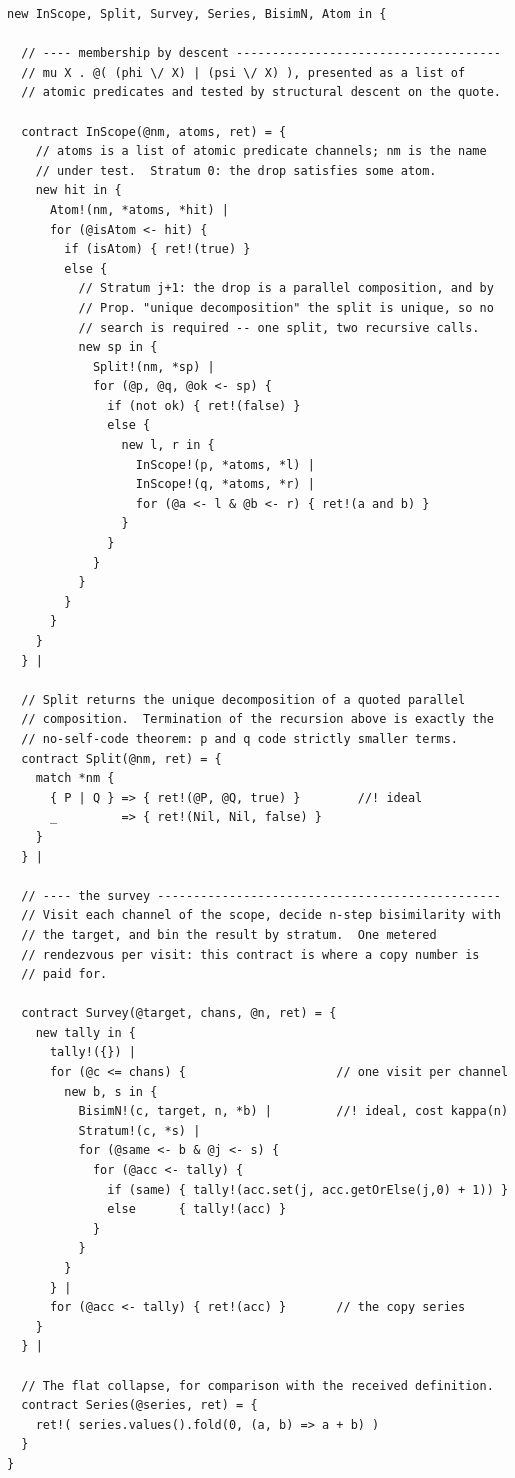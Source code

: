 \documentclass[11pt]{article}
\theoremstyle{plain}
\theoremstyle{definition}
\theoremstyle{remark}
\begin{document}
\begin{lstlisting}
new InScope, Split, Survey, Series, BisimN, Atom in {

  // ---- membership by descent -------------------------------------
  // mu X . @( (phi \/ X) | (psi \/ X) ), presented as a list of
  // atomic predicates and tested by structural descent on the quote.

  contract InScope(@nm, atoms, ret) = {
    // atoms is a list of atomic predicate channels; nm is the name
    // under test.  Stratum 0: the drop satisfies some atom.
    new hit in {
      Atom!(nm, *atoms, *hit) |
      for (@isAtom <- hit) {
        if (isAtom) { ret!(true) }
        else {
          // Stratum j+1: the drop is a parallel composition, and by
          // Prop. "unique decomposition" the split is unique, so no
          // search is required -- one split, two recursive calls.
          new sp in {
            Split!(nm, *sp) |
            for (@p, @q, @ok <- sp) {
              if (not ok) { ret!(false) }
              else {
                new l, r in {
                  InScope!(p, *atoms, *l) |
                  InScope!(q, *atoms, *r) |
                  for (@a <- l & @b <- r) { ret!(a and b) }
                }
              }
            }
          }
        }
      }
    }
  } |

  // Split returns the unique decomposition of a quoted parallel
  // composition.  Termination of the recursion above is exactly the
  // no-self-code theorem: p and q code strictly smaller terms.
  contract Split(@nm, ret) = {
    match *nm {
      { P | Q } => { ret!(@P, @Q, true) }        //! ideal
      _         => { ret!(Nil, Nil, false) }
    }
  } |

  // ---- the survey ------------------------------------------------
  // Visit each channel of the scope, decide n-step bisimilarity with
  // the target, and bin the result by stratum.  One metered
  // rendezvous per visit: this contract is where a copy number is
  // paid for.

  contract Survey(@target, chans, @n, ret) = {
    new tally in {
      tally!({}) |
      for (@c <= chans) {                     // one visit per channel
        new b, s in {
          BisimN!(c, target, n, *b) |         //! ideal, cost kappa(n)
          Stratum!(c, *s) |
          for (@same <- b & @j <- s) {
            for (@acc <- tally) {
              if (same) { tally!(acc.set(j, acc.getOrElse(j,0) + 1)) }
              else      { tally!(acc) }
            }
          }
        }
      } |
      for (@acc <- tally) { ret!(acc) }       // the copy series
    }
  } |

  // The flat collapse, for comparison with the received definition.
  contract Series(@series, ret) = {
    ret!( series.values().fold(0, (a, b) => a + b) )
  }
}
\end{lstlisting}
\end{document}
